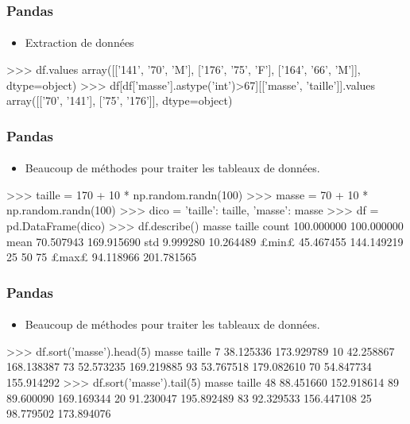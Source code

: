 \begin{frame}[fragile]
\frametitle{Pandas}
\framesubtitle{}
\begin{itemize}
 \item Extraction de données
\end{itemize}

\begin{pythonConsole}
>>> df.values
array([['141', '70', 'M'],
       ['176', '75', 'F'],
       ['164', '66', 'M']], dtype=object)
>>> df[df['masse'].astype('int')>67][['masse', 'taille']].values
array([['70', '141'],
       ['75', '176']], dtype=object)
\end{pythonConsole}
\end{frame}
\begin{frame}[fragile]
\frametitle{Pandas}
\framesubtitle{}
\begin{itemize}
 \item Beaucoup de méthodes pour traiter les tableaux de données. 
\end{itemize}

\begin{pythonConsole}
>>> taille = 170 + 10 * np.random.randn(100)
>>> masse = 70 + 10 * np.random.randn(100)
>>> dico = {'taille': taille, 'masse': masse}
>>> df = pd.DataFrame(dico)
>>> df.describe()
            masse      taille
count  100.000000  100.000000
mean    70.507943  169.915690
std      9.999280   10.264489
£min£     45.467455  144.149219
25%
50%
75%
£max£     94.118966  201.781565
\end{pythonConsole}
\end{frame}
\begin{frame}[fragile]
\frametitle{Pandas}
\framesubtitle{}
\begin{itemize}
 \item Beaucoup de méthodes pour traiter les tableaux de données. 
\end{itemize}

\begin{pythonConsole}
>>> df.sort('masse').head(5)
        masse      taille
7   38.125336  173.929789
10  42.258867  168.138387
73  52.573235  169.219885
93  53.767518  179.082610
70  54.847734  155.914292
>>> df.sort('masse').tail(5)
        masse      taille
48  88.451660  152.918614
89  89.600090  169.169344
20  91.230047  195.892489
83  92.329533  156.447108
25  98.779502  173.894076
\end{pythonConsole}
\end{frame}
